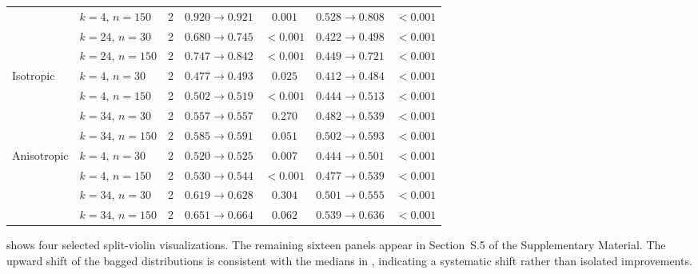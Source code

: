 \documentclass[review,11pt,3p,authoryear]{elsarticle}
\begin{document}
\begin{table}[!htbp]
\begin{tabular}{llc cc cc}
  & $k\!=\!4,\,n\!=\!150$ & 2 & $0.920\to 0.921$ & $\mathbf{0.001}$ & $0.528\to 0.808$ & $\mathbf{<\!0.001}$ \\
  & $k\!=\!24,\,n\!=\!30$ & 2 & $0.680\to 0.745$ & $\mathbf{<\!0.001}$ & $0.422\to 0.498$ & $\mathbf{<\!0.001}$ \\
  & $k\!=\!24,\,n\!=\!150$ & 2 & $0.747\to 0.842$ & $\mathbf{<\!0.001}$ & $0.449\to 0.721$ & $\mathbf{<\!0.001}$ \\
\midrule
 \multirow{4}{*}{Isotropic} & $k\!=\!4,\,n\!=\!30$ & 2 & $0.477\to 0.493$ & $\mathbf{0.025}$ & $0.412\to 0.484$ & $\mathbf{<\!0.001}$ \\
  & $k\!=\!4,\,n\!=\!150$ & 2 & $0.502\to 0.519$ & $\mathbf{<\!0.001}$ & $0.444\to 0.513$ & $\mathbf{<\!0.001}$ \\
  & $k\!=\!34,\,n\!=\!30$ & 2 & $0.557\to 0.557$ & $0.270$ & $0.482\to 0.539$ & $\mathbf{<\!0.001}$ \\
  & $k\!=\!34,\,n\!=\!150$ & 2 & $0.585\to 0.591$ & $0.051$ & $0.502\to 0.593$ & $\mathbf{<\!0.001}$ \\
\midrule
 \multirow{4}{*}{Anisotropic} & $k\!=\!4,\,n\!=\!30$ & 2 & $0.520\to 0.525$ & $\mathbf{0.007}$ & $0.444\to 0.501$ & $\mathbf{<\!0.001}$ \\
  & $k\!=\!4,\,n\!=\!150$ & 2 & $0.530\to 0.544$ & $\mathbf{<\!0.001}$ & $0.477\to 0.539$ & $\mathbf{<\!0.001}$ \\
  & $k\!=\!34,\,n\!=\!30$ & 2 & $0.619\to 0.628$ & $0.304$ & $0.501\to 0.555$ & $\mathbf{<\!0.001}$ \\
  & $k\!=\!34,\,n\!=\!150$ & 2 & $0.651\to 0.664$ & $0.062$ & $0.539\to 0.636$ & $\mathbf{<\!0.001}$ \\
\bottomrule
\end{tabular}
\end{table}

 shows four selected split-violin
visualizations. The remaining sixteen panels appear in
Section~S.5 of the Supplementary Material. The upward shift of the bagged distributions is
consistent with the medians in , indicating a
systematic shift rather than isolated improvements.
\end{document}
